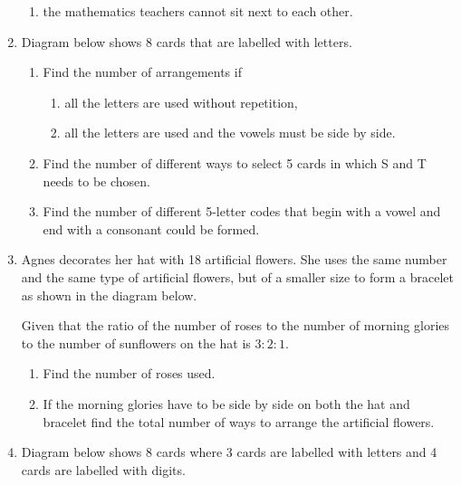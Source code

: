 \documentclass{report}
\begin{document}
\begin{multicols*}{2}
\begin{enumerate}
\begin{enumerate}
                        \item the mathematics teachers cannot sit next to each other.
                  \end{enumerate}
            \item Diagram below shows 8 cards that are labelled with letters.
                  \begin{enumerate}
                        \item Find the number of arrangements if
                              \begin{enumerate}
                                    \item all the letters are used without repetition,
                                    \item all the letters are used and the vowels must be side by side.
                              \end{enumerate}
                        \item Find the number of different ways to select 5 cards in which S and T needs to
                              be chosen.
                        \item Find the number of different 5-letter codes that begin with a vowel and end
                              with a consonant could be formed.
                  \end{enumerate}

            \item Agnes decorates her hat with 18 artificial flowers. She uses the same number
                  and the same type of artificial flowers, but of a smaller size to form a
                  bracelet as shown in the diagram below.

                  Given that the ratio of the number of roses to the number of morning glories to
                  the number of sunflowers on the hat is $3:2:1$.
                  \begin{enumerate}
                        \item Find the number of roses used.
                        \item If the morning glories have to be side by side on both the hat and bracelet
                              find the total number of ways to arrange the artificial flowers.
                  \end{enumerate}

            \item Diagram below shows 8 cards where 3 cards are labelled with letters and 4 cards
                  are labelled with digits.


\end{enumerate}
\end{multicols*}
\end{document}
